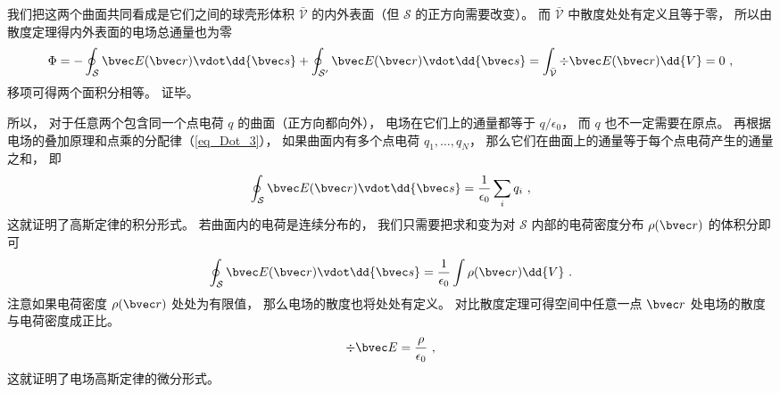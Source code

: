 我们把这两个曲面共同看成是它们之间的球壳形体积 $\bar{\mathcal V}$ 的内外表面（但 $\mathcal S$ 的正方向需要改变）。 而 $\bar{\mathcal V}$ 中散度处处有定义且等于零， 所以由散度定理得内外表面的电场总通量也为零
\begin{equation}
\Phi = -\oint_{\mathcal S} \bvec E(\bvec r) \vdot \dd{\bvec s} + \oint_{\mathcal S'} \bvec E(\bvec r)\vdot \dd{\bvec s} = \int_{\bar{\mathcal V}} \div \bvec E(\bvec r) \dd{V} = 0~,
\end{equation}
移项可得两个面积分相等。 证毕。

所以， 对于任意两个包含同一个点电荷 $q$ 的曲面（正方向都向外）， 电场在它们上的通量都等于 $q/\epsilon_0$， 而 $q$ 也不一定需要在原点。 再根据电场的叠加原理和点乘的分配律（\autoref{eq_Dot_3}）， 如果曲面内有多个点电荷 $q_1, \dots, q_N$， 那么它们在曲面上的通量等于每个点电荷产生的通量之和， 即
\begin{equation}
\oint_{\mathcal S} \bvec E(\bvec r) \vdot \dd{\bvec s} = \frac{1}{\epsilon_0} \sum_i q_i~,
\end{equation}
这就证明了高斯定律的积分形式。 若曲面内的电荷是连续分布的， 我们只需要把求和变为对 $\mathcal S$ 内部的电荷密度分布 $\rho(\bvec r)$ 的体积分即可
\begin{equation}
\oint_{\mathcal S} \bvec E(\bvec r) \vdot \dd{\bvec s} = \frac{1}{\epsilon_0} \int \rho(\bvec r) \dd{V}~.
\end{equation}
注意如果电荷密度 $\rho(\bvec r)$ 处处为有限值， 那么电场的散度也将处处有定义。 对比散度定理可得空间中任意一点 $\bvec r$ 处电场的散度与电荷密度成正比。
\begin{equation}
\div \bvec E = \frac{\rho}{\epsilon_0}~,
\end{equation}
这就证明了电场高斯定律的微分形式。
